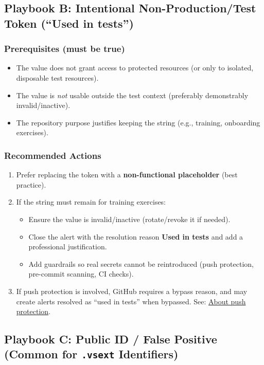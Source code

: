 \documentclass[11pt]{article}
\newcommand{\term}[1]{\textbf{#1}}
\newcommand{\code}[1]{\texttt{#1}}
\begin{document}
\subsection{Playbook B: Intentional Non-Production/Test Token (``Used in tests'')}
\subsubsection{Prerequisites (must be true)}
\begin{itemize}
  \item The value does not grant access to protected resources (or only to isolated, disposable test resources).
  \item The value is \emph{not} usable outside the test context (preferably demonstrably invalid/inactive).
  \item The repository purpose justifies keeping the string (e.g., training, onboarding exercises).
\end{itemize}

\subsubsection{Recommended Actions}
\begin{enumerate}
  \item Prefer replacing the token with a \textbf{non-functional placeholder} (best practice).
  \item If the string must remain for training exercises:
  \begin{itemize}
    \item Ensure the value is invalid/inactive (rotate/revoke it if needed).
    \item Close the alert with the resolution reason \term{Used in tests} and add a professional justification.
    \item Add guardrails so real secrets cannot be reintroduced (push protection, pre-commit scanning, CI checks).
  \end{itemize}
  \item If push protection is involved, GitHub requires a bypass reason, and may create alerts resolved as ``used in tests'' when bypassed. See: \href{https://docs.github.com/en/code-security/concepts/secret-security/about-push-protection}{About push protection}.
\end{enumerate}

\subsection{Playbook C: Public ID / False Positive (Common for \code{.vsext} Identifiers)}
\end{document}

